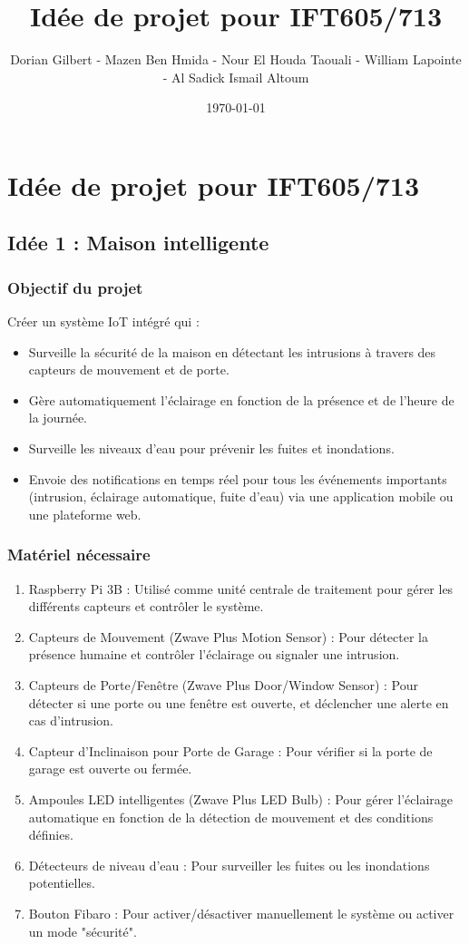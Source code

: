 \documentclass[a4paper ,10pt]{article}
\title{Idée de projet pour IFT605/713}
\date{\today}
\author{Dorian Gilbert - Mazen Ben Hmida - Nour El Houda Taouali - William Lapointe - Al Sadick Ismail Altoum}
\begin{document}

\section*{Idée de projet pour IFT605/713}

\subsection*{Idée 1 : Maison intelligente}

\subsubsection*{Objectif du projet}
Créer un système IoT intégré qui :

\begin{itemize}
  \item Surveille la sécurité de la maison en détectant les intrusions à travers des capteurs de mouvement et de porte.
  \item Gère automatiquement l’éclairage en fonction de la présence et de l’heure de la journée.
  \item Surveille les niveaux d'eau pour prévenir les fuites et inondations.
  \item Envoie des notifications en temps réel pour tous les événements importants (intrusion, éclairage automatique, fuite d'eau) via une application mobile ou une plateforme web.
\end{itemize}

\subsubsection*{Matériel nécessaire}

\begin{enumerate}
  \item Raspberry Pi 3B : Utilisé comme unité centrale de traitement pour gérer les différents capteurs et contrôler le système.
  \item Capteurs de Mouvement (Zwave Plus Motion Sensor) : Pour détecter la présence humaine et contrôler l'éclairage ou signaler une intrusion.
  \item Capteurs de Porte/Fenêtre (Zwave Plus Door/Window Sensor) : Pour détecter si une porte ou une fenêtre est ouverte, et déclencher une alerte en cas d'intrusion.
  \item Capteur d'Inclinaison pour Porte de Garage : Pour vérifier si la porte de garage est ouverte ou fermée.
  \item Ampoules LED intelligentes (Zwave Plus LED Bulb) : Pour gérer l'éclairage automatique en fonction de la détection de mouvement et des conditions définies.
  \item Détecteurs de niveau d'eau : Pour surveiller les fuites ou les inondations potentielles.
  \item Bouton Fibaro : Pour activer/désactiver manuellement le système ou activer un mode "sécurité".
\end{enumerate}
\end{document}
